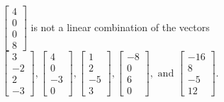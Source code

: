 \begin{exercise}
\begin{exerciseStatement}
  \end{exerciseStatement}
  \begin{exerciseAnswer}
   \(\left[\begin{array}{c}
4 \\
0 \\
0 \\
8
\end{array}\right]\) 
  	 is not  
	a linear combination of the vectors \(\left[\begin{array}{c}
3 \\
-2 \\
2 \\
-3
\end{array}\right] , \left[\begin{array}{c}
4 \\
0 \\
-3 \\
0
\end{array}\right] , \left[\begin{array}{c}
1 \\
2 \\
-5 \\
3
\end{array}\right] , \left[\begin{array}{c}
-8 \\
0 \\
6 \\
0
\end{array}\right] , \text{ and } \left[\begin{array}{c}
-16 \\
8 \\
-5 \\
12
\end{array}\right]\).

	
  


  \end{exerciseAnswer}
\end{exercise}